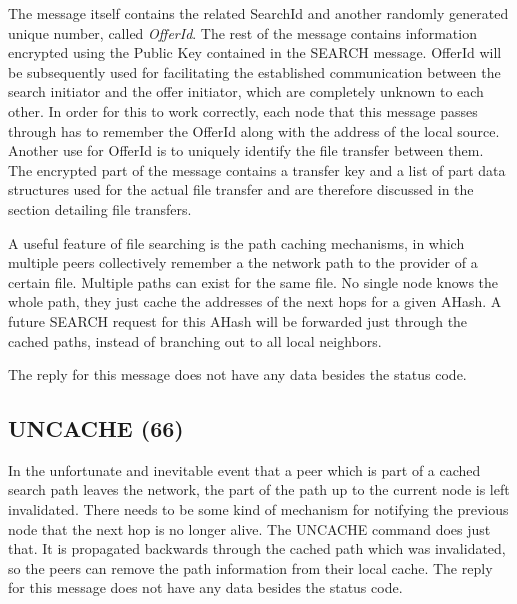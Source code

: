 The message itself contains the related SearchId and another randomly generated 
unique number, called \textit{OfferId}. The rest of the message contains 
information encrypted using the Public Key contained in the SEARCH message. 
OfferId will be subsequently used for facilitating the established 
communication between the search initiator and the offer initiator, which are 
completely unknown to each other. In order for this to work correctly, each 
node that this message passes through has to remember the OfferId along with 
the address of the local source. Another use for OfferId is to uniquely 
identify the file transfer between them. The encrypted part of the message 
contains a transfer key and a list of part data structures used for the actual 
file transfer and are therefore discussed in the section detailing file 
transfers.

A useful feature of file searching is the path caching mechanisms, in which 
multiple peers collectively remember a the network path to the provider of a 
certain file. Multiple paths can exist for the same file. No single node knows 
the whole path, they just cache the addresses of the next hops for a given 
AHash. A future SEARCH request for this AHash will be forwarded just through 
the cached paths, instead of branching out to all local neighbors.

The reply for this message does not have any data besides the status code.

\begin{figure}[H]
    \centering
\end{figure}

\subsection{UNCACHE (66)}

In the unfortunate and inevitable event that a peer which is part of a cached 
search path leaves the network, the part of the path up to the current node is 
left invalidated. There needs to be some kind of mechanism for notifying the 
previous node that the next hop is no longer alive. The UNCACHE command does 
just that. It is propagated backwards through the cached path which was 
invalidated, so the peers can remove the path information from their local 
cache. The reply for this message does not have any data besides the status 
code.

